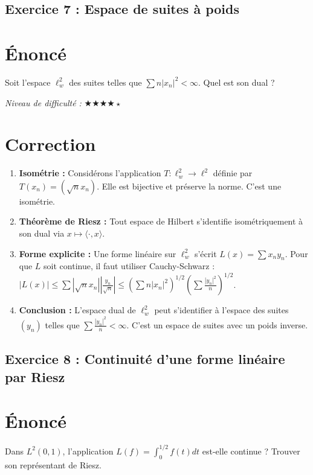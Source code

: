 \documentclass[11pt,a4paper]{article}
\begin{document}
\subsection*{Exercice 7 : Espace de suites à poids}

\section{Énoncé}

Soit l'espace $\ell^2_w$ des suites telles que $\sum n |x_n|^2 < \infty$. Quel est son dual ?

\textit{Niveau de difficulté :} $\bigstar\bigstar\bigstar\bigstar\star$

\section{Correction}

\begin{enumerate}
\item \textbf{Isométrie :} Considérons l'application $T : \ell^2_w \to \ell^2$ définie par $T(x_n) = (\sqrt{n} x_n)$. Elle est bijective et préserve la norme. C'est une isométrie.
\item \textbf{Théorème de Riesz :} Tout espace de Hilbert s'identifie isométriquement à son dual via $x \mapsto \langle \cdot, x \rangle$.
\item \textbf{Forme explicite :} Une forme linéaire sur $\ell^2_w$ s'écrit $L(x) = \sum x_n y_n$. Pour que $L$ soit continue, il faut utiliser Cauchy-Schwarz : $|L(x)| \le \sum |\sqrt{n} x_n| |\frac{y_n}{\sqrt{n}}| \le (\sum n |x_n|^2)^{1/2} (\sum \frac{|y_n|^2}{n})^{1/2}$.
\item \textbf{Conclusion :} L'espace dual de $\ell^2_w$ peut s'identifier à l'espace des suites $(y_n)$ telles que $\sum \frac{|y_n|^2}{n} < \infty$. C'est un espace de suites avec un poids inverse.
\end{enumerate}


\subsection*{Exercice 8 : Continuité d'une forme linéaire par Riesz}

\section{Énoncé}

Dans $L^2(0, 1)$, l'application $L(f) = \int_0^{1/2} f(t) dt$ est-elle continue ? Trouver son représentant de Riesz.
\end{document}

